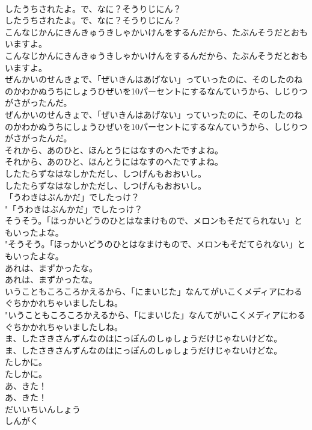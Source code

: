 \documentclass[8pt]{extreport}
\begin{document}
\begin{CJK}{UTF8}{min}
\\	したうちされたよ。で、なに？そうりじにん？	
\\	したうちされたよ。で、なに？そうりじにん？ 
\\	こんなじかんにきんきゅうきしゃかいけんをするんだから、たぶんそうだとおもいますよ。	
\\	こんなじかんにきんきゅうきしゃかいけんをするんだから、たぶんそうだとおもいますよ。 
\\	ぜんかいのせんきょで、「ぜいきんはあげない」っていったのに、そのしたのねのかわかぬうちにしょうひぜいを10パーセントにするなんていうから、しじりつがさがったんだ。	
\\	ぜんかいのせんきょで、「ぜいきんはあげない」っていったのに、そのしたのねのかわかぬうちにしょうひぜいを10パーセントにするなんていうから、しじりつがさがったんだ。 
\\	それから、あのひと、ほんとうにはなすのへたですよね。	
\\	それから、あのひと、ほんとうにはなすのへたですよね。 
\\	したたらずなはなしかただし、しつげんもおおいし。	
\\	したたらずなはなしかただし、しつげんもおおいし。 
\\	「うわきはぶんかだ」でしたっけ？	
\\	"「うわきはぶんかだ」でしたっけ？ 
\\	そうそう。「ほっかいどうのひとはなまけもので、メロンもそだてられない」ともいったよな。	
\\	"そうそう。「ほっかいどうのひとはなまけもので、メロンもそだてられない」ともいったよな。 
\\	あれは、まずかったな。	
\\	あれは、まずかったな。 
\\	いうこともころころかえるから、「にまいじた」なんてがいこくメディアにわるぐちかかれちゃいましたしね。	
\\	"いうこともころころかえるから、「にまいじた」なんてがいこくメディアにわるぐちかかれちゃいましたしね。 
\\	ま、したさきさんずんなのはにっぽんのしゅしょうだけじゃないけどな。	
\\	ま、したさきさんずんなのはにっぽんのしゅしょうだけじゃないけどな。 
\\	たしかに。	
\\	たしかに。 
\\	あ、きた！	
\\	あ、きた！ 
\\	だいいちいんしょう
\\	しんがく

\end{CJK}
\end{document}
